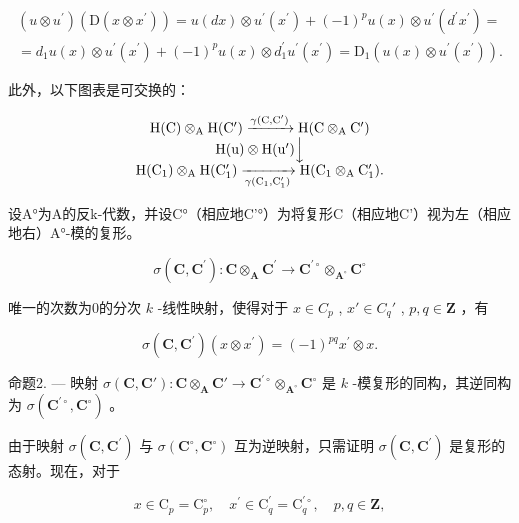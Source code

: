 \[
\begin{array}{c} (u \otimes u ^ {\prime}) (\mathrm{D} (x \otimes x ^ {\prime})) = u (d x) \otimes u ^ {\prime} (x ^ {\prime}) + (- 1) ^ {p} u (x) \otimes u ^ {\prime} (d ^ {\prime} x ^ {\prime}) = \\ = d _ {1} u (x) \otimes u ^ {\prime} (x ^ {\prime}) + (- 1) ^ {p} u (x) \otimes d _ {1} ^ {\prime} u ^ {\prime} (x ^ {\prime}) = \mathrm{D} _ {1} (u (x) \otimes u ^ {\prime} (x ^ {\prime}))  . \end{array}
\]

此外，以下图表是可交换的：

\[
\begin{array}{c} \mathrm{H(C)} \otimes_ {\mathrm{A}} \mathrm {H(C^ {\prime})} \xrightarrow {\gamma (\mathrm{C,C} ^ {\prime})} \mathrm{H(C} \otimes_ {\mathrm{A}} \mathrm {C^ {\prime}}) \\ \mathrm{H(u)} \otimes \mathrm {H(u^{\prime})} \Big \downarrow \\ \mathrm {H(C_ {1})} \otimes_ {\mathrm{A}} \mathrm {H(C_ {1} ^ {\prime})} \xrightarrow [ \gamma (\mathrm {C_ {1}} , \mathrm {C_ {1} ^ {\prime}}) ]{} \mathrm {H(C_ {1}} \otimes_ {\mathrm{A}} \mathrm {C_ {1} ^ {\prime}}). \end{array}
\]

设A°为A的反k-代数，并设C°（相应地C'°）为将复形C（相应地C'）视为左（相应地右）A°-模的复形。

\[
\sigma (\mathbf {C}, \mathbf {C} ^ {\prime}): \mathbf {C} \otimes_ {\mathbf {A}} \mathbf {C} ^ {\prime} \rightarrow \mathbf {C} ^ {\prime \circ} \otimes_ {\mathbf {A} ^ {\circ}} \mathbf {C} ^ {\circ}
\]

唯一的次数为0的分次 \(k\) -线性映射，使得对于 \(x \in C_p\) , \(x' \in C_q'\) , \(p, q \in \mathbf{Z}\) ，有

\[
\sigma (\mathbf {C}, \mathbf {C} ^ {\prime}) (x \otimes x ^ {\prime}) = (- 1) ^ {p q} x ^ {\prime} \otimes x.
\]

命题2. — 映射 \(\sigma(\mathbf{C},\mathbf{C}'):\mathbf{C}\otimes_{\mathbf{A}}\mathbf{C}'\to\mathbf{C}^{\prime\circ}\otimes_{\mathbf{A}^{\circ}}\mathbf{C}^{\circ}\) 是 \(k\) -模复形的同构，其逆同构为 \(\sigma(\mathbf{C}^{\prime\circ},\mathbf{C}^{\circ})\) 。

由于映射 \(\sigma(\mathbf{C},\mathbf{C}^{\prime})\) 与 \(\sigma(\mathbf{C}^{\circ},\mathbf{C}^{\circ})\) 互为逆映射，只需证明 \(\sigma(\mathbf{C},\mathbf{C}^{\prime})\) 是复形的态射。现在，对于

\[
x \in \mathrm{C} _ {p} = \mathrm{C} _ {p} ^ {\circ}, \quad x ^ {\prime} \in \mathrm{C} _ {q} ^ {\prime} = \mathrm{C} _ {q} ^ {\prime \circ}, \quad p, q \in \mathbf {Z},
\]

